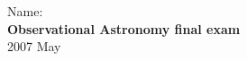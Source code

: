 \documentclass[12pt]{article}
\begin{document}
\noindent
Name:\,\makebox[0.8\textwidth]{\hrulefill} \\
\textbf{Observational Astronomy final exam} \\
2007 May \\
\end{document}
